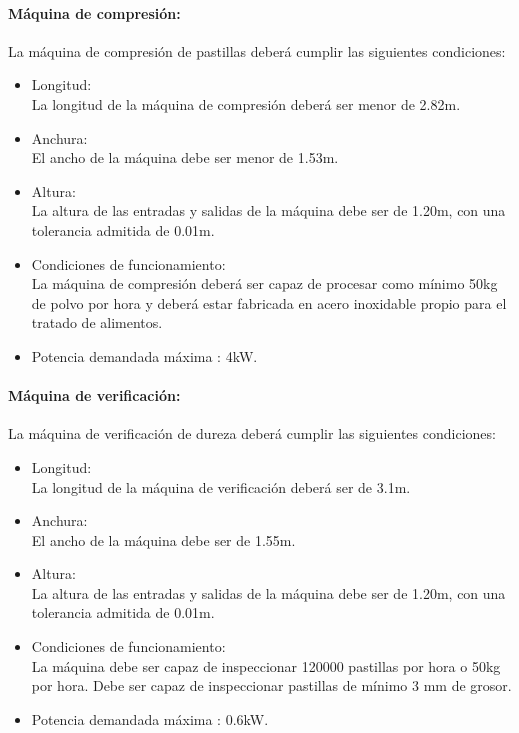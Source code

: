\paragraph{Máquina de compresión:}
		La máquina de compresión de pastillas deberá cumplir las siguientes condiciones:
		
		\begin{itemize}
			\item{Longitud:}\\
			La longitud de la máquina de compresión deberá ser menor de 2.82m.   

			\item{Anchura:}\\
			El ancho de la máquina debe ser menor de 1.53m.
			
			\item{Altura:}\\
			La altura de las entradas y salidas de la máquina debe ser de 1.20m, con una tolerancia admitida de 0.01m.
			
			
			\item{Condiciones de funcionamiento: }\\
			La máquina de compresión deberá ser capaz de procesar como mínimo 50kg de polvo por hora y deberá estar fabricada en acero inoxidable propio para el tratado de alimentos.
			

			\item{Potencia demandada máxima :} 4kW.
		
		\end{itemize}


\paragraph{Máquina de verificación:}
		La máquina de verificación de dureza deberá cumplir las siguientes condiciones:
		
		\begin{itemize}
			\item{Longitud:}\\
			La longitud de la máquina de verificación deberá ser de 3.1m. 

			\item{Anchura:}\\
			El ancho de la máquina debe ser de 1.55m.
			
			\item{Altura:}\\
			La altura de las entradas y salidas de la máquina debe ser de 1.20m, con una tolerancia admitida de 0.01m.
			
			
			\item{Condiciones de funcionamiento: }\\
			La máquina debe ser capaz de inspeccionar 120000 pastillas por hora o 50kg por hora. Debe ser capaz de inspeccionar pastillas de mínimo 3 mm de grosor.

			\item{Potencia demandada máxima :} 0.6kW.
		
		\end{itemize}



